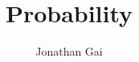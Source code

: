 
\usepackage{bbm}
\usepackage{nicefrac}
\usepackage{pgfplots}
\pgfplotsset{compat=1.18}
\author{Jonathan Gai}
\title{Probability}


\maketitle
\tableofcontents
{}
